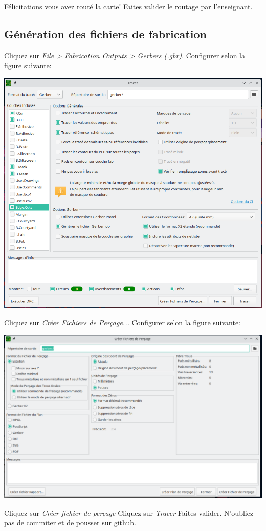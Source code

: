 \documentclass[12pt,%
addpoints,%
]{exam}
\begin{document}
	\vspace{2em}
	Félicitations vous avez routé la carte! Faites valider le routage par l'enseignant.

	\newpage
\subsection{Génération des fichiers de fabrication}
\begin{questions}
	\question Cliquez sur \emph{File > Fabrication Outputs > Gerbers (.gbr)}.
	\question Configurer selon la figure suivante:
	\begin{center}
        \includegraphics[scale=.6]{figures/kicad31.png}
    \end{center}
	\question Cliquez sur \emph{Créer Fichiers de Perçage...}
	\newpage
	\question Configurer selon la figure suivante:
	\begin{center}
        \includegraphics[scale=.6]{figures/kicad32.png}
    \end{center}
	\question Cliquez sur \emph{Créer fichier de perçage}
	\question Cliquez sur \emph{Tracer}
	\question Faites valider. N'oubliez pas de commiter et de pousser sur github.
\end{questions}
\end{document}
